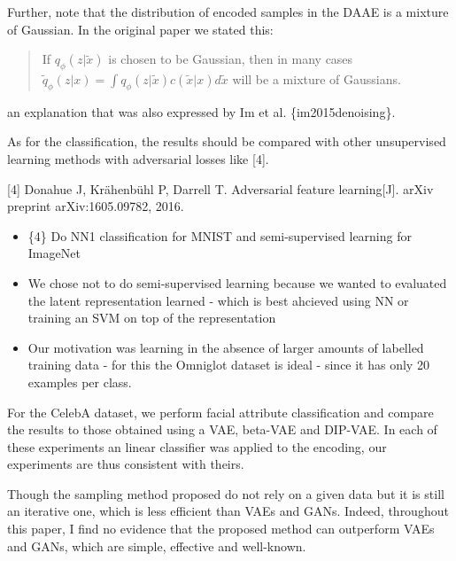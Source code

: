 \documentclass{article}
\begin{document}
Further, note that the distribution of encoded samples in the DAAE is a mixture of Gaussian. In the original paper we stated this:

\begin{quote}
If $q_\phi(z|\tilde{x})$ is chosen to be Gaussian, then in many cases $\tilde{q}_\phi(z|x) = \int q_\phi(z|\tilde{x})c(\tilde{x}|x)d \tilde{x}$ will be a mixture of Gaussians.
\end{quote}
an explanation that was also expressed by Im et al. \{im2015denoising\}.



{\color{blue}
As for the classification, the results should be compared with other unsupervised learning methods with adversarial losses like [4].

[4] Donahue J, Krähenbühl P, Darrell T. Adversarial feature learning[J]. arXiv preprint arXiv:1605.09782, 2016.}

\begin{itemize}
    \item \{4\} Do NN1 classification for MNIST and semi-supervised learning for ImageNet
    \item We chose not to do semi-supervised learning because we wanted to evaluated the latent representation learned - which is best ahcieved using NN or training an SVM on top of the representation
    \item Our motivation was learning in the absence of larger amounts of labelled training data - for this the Omniglot dataset is ideal - since it has only 20 examples per class.
\end{itemize}

For the CelebA dataset, we perform facial attribute classification and compare the results to those obtained using a VAE, beta-VAE and DIP-VAE. In each of these experiments an linear classifier was applied to the encoding, our experiments are thus consistent with theirs.

{\color{blue}
Though the sampling method proposed do not rely on a given data but it is still an iterative one, which is less efficient than VAEs and GANs. Indeed, throughout this paper, I find no evidence that the proposed method can outperform VAEs and GANs, which are simple, effective and well-known.}\\
\end{document}
